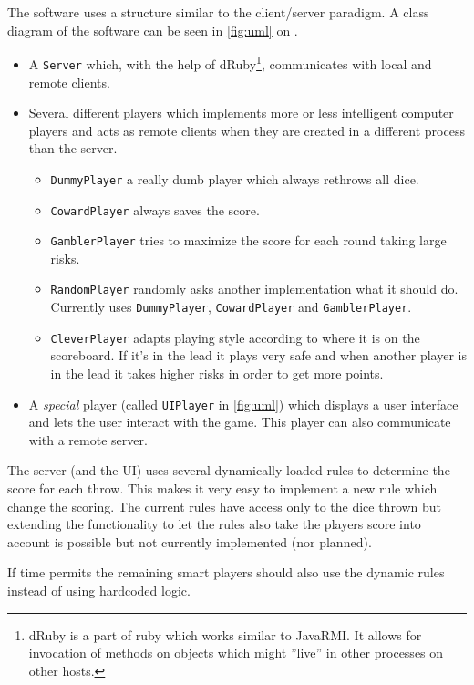 \documentclass[10pt, titlepage, oneside, a4paper]{article}
\begin{document}
		The software uses a structure similar to the client/server paradigm. A class diagram of the software can be seen in \figurename{} \ref{fig:uml} on \pagename{} \pageref{fig:uml}.
		\begin{itemize}
			\item A {\tt Server} which, with the help of dRuby\footnote{dRuby is a part of ruby which works similar to JavaRMI. It allows for invocation of methods on objects which might ''live'' in other processes on other hosts.}, communicates with local and remote clients.
			\item Several different players which implements more or less intelligent computer players and acts as remote clients when they are created in a different process than the server.
				\begin{itemize}
					\item {\tt DummyPlayer} a really dumb player which always rethrows all dice.
					\item {\tt CowardPlayer} always saves the score.
					\item {\tt GamblerPlayer} tries to maximize the score for each round taking large risks.
					\item {\tt RandomPlayer} randomly asks another implementation what it should do. Currently uses {\tt DummyPlayer}, {\tt CowardPlayer} and {\tt GamblerPlayer}.
					\item {\tt CleverPlayer} adapts playing style according to where it is on the scoreboard. If it's in the lead it plays very safe and when another player is in the lead it takes higher risks in order to get more points.
				\end{itemize}
			\item A \emph{special} player (called {\tt UIPlayer} in \figurename{} \ref{fig:uml}) which displays a user interface and lets the user interact with the game. This player can also communicate with a remote server.
		\end{itemize}
		
		The server (and the UI) uses several dynamically loaded rules to determine the score for each throw. This makes it very easy to implement a new rule which change the scoring. The current rules have access only to the dice thrown but extending the functionality to let the rules also take the players score into account is possible but not currently implemented (nor planned).
		
		If time permits the remaining smart players should also use the dynamic rules instead of using hardcoded logic.
	
\end{document}

